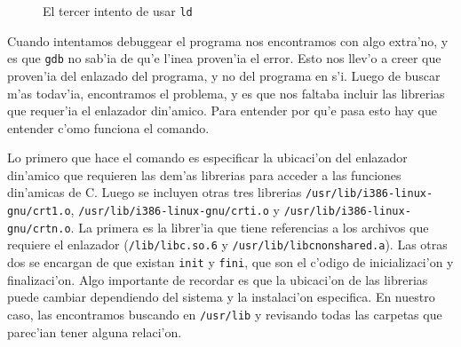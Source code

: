 \documentclass[11pt]{article}
\begin{document}
		\begin{figure}[H]
			\centering
			 \par
			
			\caption{El tercer intento de usar \texttt{ld}}
			\label{fig:third-ld-attempt}
		\end{figure}
		
		Cuando intentamos debuggear el programa nos encontramos con algo extra'no, y es que \texttt{gdb} no sab'ia de qu'e l'inea proven'ia el error. Esto nos llev'o a creer que proven'ia del enlazado del programa, y no del programa en s'i. Luego de buscar m'as todav'ia, encontramos el problema, y es que nos faltaba incluir las librerias que requer'ia el enlazador din'amico. Para entender por qu'e pasa esto hay que entender c'omo funciona el comando.
		
		Lo primero que hace el comando es especificar la ubicaci'on del enlazador din'amico que requieren las dem'as librerias para acceder a las funciones din'amicas de C. Luego se incluyen otras tres librerias \texttt{/usr/lib/i386-linux-gnu/crt1.o}, \texttt{/usr/lib/i386-linux-gnu/crti.o} y \texttt{/usr/lib/i386-linux-gnu/crtn.o}. La primera es la librer'ia que tiene referencias a los archivos que requiere el enlazador (\texttt{/lib/libc.so.6} y \texttt{/usr/lib/libc\textunderscore\/nonshared.a}). Las otras dos se encargan de que existan \texttt{\textunderscore\/init} y \texttt{\textunderscore\/fini}, que son el c'odigo de inicializaci'on y finalizaci'on. Algo importante de recordar es que la ubicaci'on de las librerias puede cambiar dependiendo del sistema y la instalaci'on especifica. En nuestro caso, las encontramos buscando en \texttt{/usr/lib} y revisando todas las carpetas que parec'ian tener alguna relaci'on.
	
\end{document}
